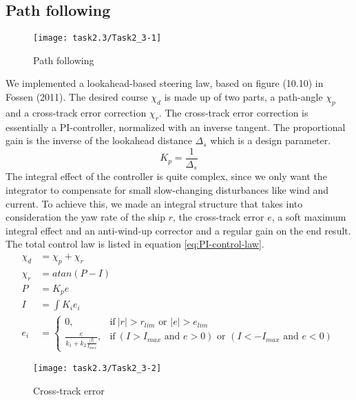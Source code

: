 \subsection{Path following}\label{sec:prob2.2}
\begin{wrapfigure}{R}{0.4 \textwidth}
   \vspace{-30pt}
   \begin{center}
    \texttt{[image: task2.3/Task2\_3-1]}
    \caption{Path following}
   \end{center}
    \label{fig:2.3-path}
\end{wrapfigure}

We implemented a lookahead-based steering law, based on figure (10.10) in Fossen (2011). The desired course $\chi_d$ is made up of two parts, a path-angle $\chi_p$ and a cross-track error correction $\chi_r$. The cross-track error correction is essentially a PI-controller, normalized with an inverse tangent. The proportional gain is the inverse of the lookahead distance $\Delta_s$ which is a design parameter.
\begin{equation}
	K_p = \frac{1}{\Delta_s}
\end{equation}
The integral effect of the controller is quite complex, since we only want the integrator to compensate for small slow-changing disturbances like wind and current. To achieve this, we made an integral structure that takes into consideration the yaw rate of the ship $r$, the cross-track error $e$, a soft maximum integral effect and an anti-wind-up corrector and a regular gain on the end result. The total control law is listed in equation \ref{eq:PI-control-law}.
\begin{equation}
\begin{split}
	\chi_d &= \chi_p + \chi_r \\
	\chi_r &= atan(P - I) \\
	P &= K_p e \\
	I &= \int K_i e_i \\
	e_i &=	\begin{cases}
			0,								& \text{if}\ | r | > r_{lim} \text{ or }  | e | > e_{lim} \\
      			\frac{e}{k_1+k_2 \frac{| I |}{I_{max}}},		& \text{if}\ (I > I_{max} \text{ and } e>0) \text{ or }( I< -I_{max} \text{ and } e<0 )
      			\end{cases}
\end{split}
\label{eq:PI-control-law}
\end{equation}



\begin{figure}
   \centering
    \texttt{[image: task2.3/Task2\_3-2]}
    \caption{Cross-track error}
    \label{fig:2.3-error}
\end{figure}
